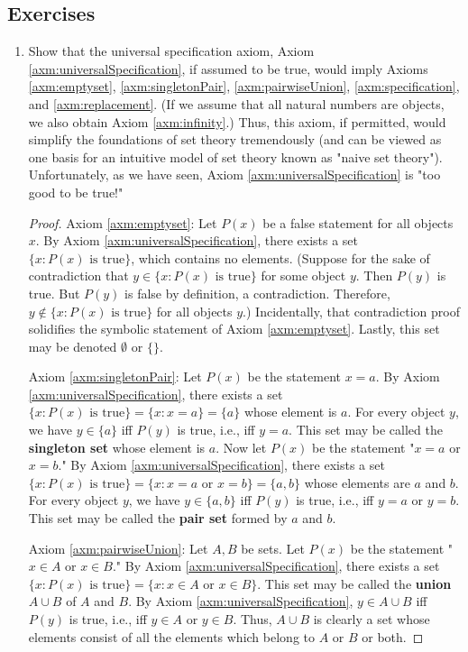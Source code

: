 \documentclass[../main.tex]{subfiles}
\begin{document}
\subsection*{Exercises}
\begin{enumerate}[ref={\thesection.\arabic*}]
    \item \label{exr:3.2.1}Show that the universal specification axiom, Axiom \ref{axm:universalSpecification}, if assumed to be true, would imply Axioms \ref{axm:emptyset}, \ref{axm:singletonPair}, \ref{axm:pairwiseUnion}, \ref{axm:specification}, and \ref{axm:replacement}. (If we assume that all natural numbers are objects, we also obtain Axiom \ref{axm:infinity}.) Thus, this axiom, if permitted, would simplify the foundations of set theory tremendously (and can be viewed as one basis for an intuitive model of set theory known as "naive set theory"). Unfortunately, as we have seen, Axiom \ref{axm:universalSpecification} is "too good to be true!"
    \begin{proof}
        Axiom \ref{axm:emptyset}: Let $P(x)$ be a false statement for all objects $x$. By Axiom \ref{axm:universalSpecification}, there exists a set $\{x:P(x)\text{ is true}\}$, which contains no elements. (Suppose for the sake of contradiction that $y\in\{x:P(x)\text{ is true}\}$ for some object $y$. Then $P(y)$ is true. But $P(y)$ is false by definition, a contradiction. Therefore, $y\notin\{x:P(x)\text{ is true}\}$ for all objects $y$.) Incidentally, that contradiction proof solidifies the symbolic statement of Axiom \ref{axm:emptyset}. Lastly, this set may be denoted $\emptyset$ or $\{\}$.\par
        Axiom \ref{axm:singletonPair}: Let $P(x)$ be the statement $x=a$. By Axiom \ref{axm:universalSpecification}, there exists a set $\{x:P(x)\text{ is true}\}=\{x:x=a\}=\{a\}$ whose element is $a$. For every object $y$, we have $y\in\{a\}$ iff $P(y)$ is true, i.e., iff $y=a$. This set may be called the \textbf{singleton set} whose element is $a$. Now let $P(x)$ be the statement "$x=a$ or $x=b$." By Axiom \ref{axm:universalSpecification}, there exists a set $\{x:P(x)\text{ is true}\}=\{x:x=a\text{ or }x=b\}=\{a,b\}$ whose elements are $a$ and $b$. For every object $y$, we have $y\in\{a,b\}$ iff $P(y)$ is true, i.e., iff $y=a$ or $y=b$. This set may be called the \textbf{pair set} formed by $a$ and $b$.\par
        Axiom \ref{axm:pairwiseUnion}: Let $A,B$ be sets. Let $P(x)$ be the statement "$x\in A$ or $x\in B$." By Axiom \ref{axm:universalSpecification}, there exists a set $\{x:P(x)\text{ is true}\}=\{x:x\in A\text{ or }x\in B\}$. This set may be called the \textbf{union} $A\cup B$ of $A$ and $B$. By Axiom \ref{axm:universalSpecification}, $y\in A\cup B$ iff $P(y)$ is true, i.e., iff $y\in A$ or $y\in B$. Thus, $A\cup B$ is clearly a set whose elements consist of all the elements which belong to $A$ or $B$ or both.\par

\end{proof}
\end{enumerate}
\end{document}
